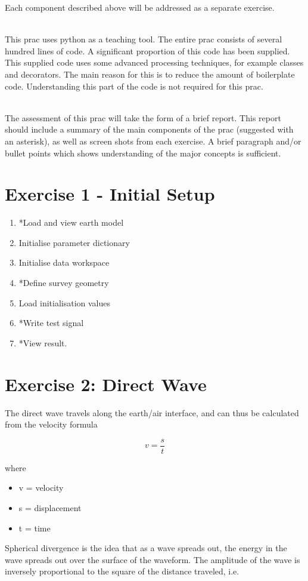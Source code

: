 \documentclass[a4paper, 10pt]{article}
\begin{document}
Each component described above will be addressed as a separate exercise.
\par~\\
This prac uses python as a teaching tool.  The entire prac consists of several hundred lines of code. A significant proportion of this code has been supplied.  This supplied code uses some advanced processing techniques, for example classes and decorators.  The main reason for this is to reduce the amount of boilerplate code.  Understanding this part of the code  is not required for this prac.  
\par~\\
The assessment of this prac will take the form of a brief report.  This report should include a summary of the main components of the prac (suggested with an asterisk), as well as screen shots from each exercise.  A brief paragraph and/or bullet points which shows understanding of the major concepts is sufficient.  

\section*{Exercise 1 - Initial Setup}
\begin{enumerate}
\item *Load and view earth model
\item Initialise parameter dictionary
\item Initialise data workspace
\item *Define survey geometry
\item Load initialisation values
\item *Write test signal
\item *View result.
\end{enumerate}


\section*{Exercise 2: Direct Wave}
The direct wave travels along the earth/air interface, and can thus be calculated from the velocity formula

\[ v = \frac{s}{t} \]

where 
\begin{itemize}
\item v = velocity
\item s = displacement
\item t = time
\end{itemize}

Spherical divergence is the idea that as a wave spreads out, the energy in the wave spreads out over the surface of the waveform. The amplitude of the wave is inversely proportional to the square of the distance traveled, i.e.
\end{document}
